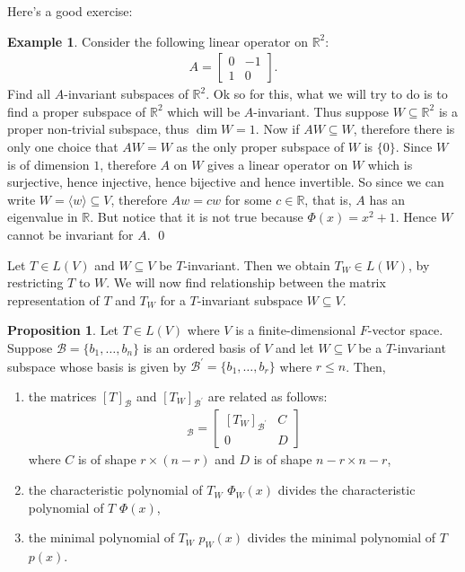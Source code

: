 \documentclass[letterpaper,11pt,twoside]{article}
\theoremstyle{definition}
\newtheorem{proposition}{Proposition}[subsection]
\theoremstyle{definition}
\theoremstyle{definition}
\theoremstyle{definition}
\theoremstyle{definition}
\theoremstyle{definition}
\newtheorem*{example}{\textbf{Example}}
\theoremstyle{remark}
\theoremstyle{definition}
\newcommand{\R}[0]{\mathbb{R}}
\newcommand{\gen}[1]{\langle #1\rangle}
\begin{document}
    Here's a good exercise:
    \begin{example}
    Consider the following linear operator on $\R^2$:
    \begin{align*}
        A = \begin{bmatrix}
        0&-1\\
        1&0
        \end{bmatrix}.
    \end{align*}
    Find all $A$-invariant subspaces of $\R^2$. Ok so for this, what we will try to do is to find a proper subspace of $\R^2$ which will be $A$-invariant. Thus suppose $W\subseteq \R^2$ is a proper non-trivial subspace, thus $\dim W = 1$. Now if $AW \subseteq W$, therefore there is only one choice that $AW = W$ as the only proper subspace of $W$ is $\{0\}$. Since $W$ is of dimension $1$, therefore $A$ on $W$ gives a linear operator on $W$ which is surjective, hence injective, hence bijective and hence invertible. So since we can write $W = \gen{w} \subseteq V$, therefore $Aw = cw$ for some $c\in \R$, that is, $A$ has an eigenvalue in $\R$. But notice that it is not true because $\Phi(x) = x^2+1$. Hence $W$ cannot be invariant for $A$. \qed
    \end{example}
    Let $T\in L(V)$ and $W\subseteq V$ be $T$-invariant. Then we obtain $T_W \in L(W)$, by restricting $T$ to $W$. We will now find relationship between the matrix representation of $T$ and $T_W$ for a $T$-invariant subspace $W\subseteq V$.
    \begin{proposition}
        Let $T \in L(V)$ where $V$ is a finite-dimensional $F$-vector space. Suppose $\mathcal{B} = \{b_1,\dots,b_n\}$ is an ordered basis of $V$ and let $W\subseteq V$ be a $T$-invariant subspace whose basis is given by $\mathcal{B}^\prime = \{b_1,\dots,b_r\}$ where $r\le n$. Then, 
        \begin{enumerate}
            \item {the matrices $[T]_{\mathcal{B}}$ and $[T_W]_{\mathcal{B}^\prime}$ are related as follows:
            \begin{align*}
                [T]_{\mathcal{B}} = \begin{bmatrix}
                    [T_W]_{\mathcal{B}^\prime} &C\\
                    0& D
                \end{bmatrix}
            \end{align*}
            where $C$ is of shape $r\times (n-r)$ and $D$ is of shape $n-r\times n-r$,
            }
            \item {the characteristic polynomial of $T_W$ $\Phi_W(x)$ divides the characteristic polynomial of $T$ $\Phi(x)$,}
            \item {the minimal polynomial of $T_W$ $p_W(x)$ divides the minimal polynomial of $T$ $p(x)$.}
        \end{enumerate}
    \end{proposition}
\end{document}

